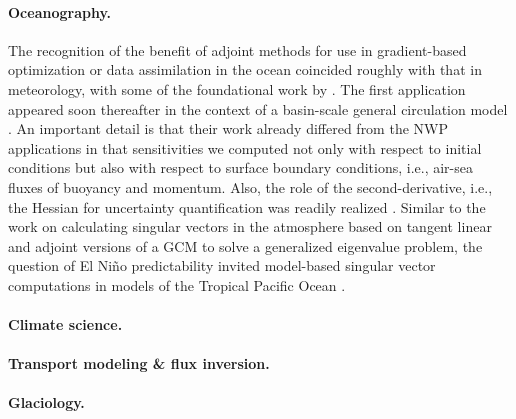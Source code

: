 \paragraph{Oceanography.}
The recognition of the benefit of adjoint methods for use in gradient-based optimization or data assimilation in the ocean coincided roughly with that in meteorology, with some of the foundational work by \cite{Thacker:1988kp,Thacker:1988ed}. 
The first application appeared soon thereafter in the context of a basin-scale general circulation model \cite{Tziperman.1989,Tziperman:1992hg,Tziperman:1992jw}. 
An important detail is that their work already differed from the NWP applications in that sensitivities we computed not only with respect to initial conditions but also with respect to surface boundary conditions, i.e., air-sea fluxes of buoyancy and momentum.
Also, the role of the second-derivative, i.e., the Hessian for uncertainty quantification was readily realized \cite{Thacker:1989jf}.
Similar to the work on calculating singular vectors in the atmosphere based on tangent linear and adjoint versions of a GCM to solve a generalized eigenvalue problem, the question of El Niño predictability invited model-based singular vector computations in models of the Tropical Pacific Ocean \cite{Moore:1997ci,Moore:1997fp}.


\paragraph{Climate science.}

\paragraph{Transport modeling \& flux inversion.}

\paragraph{Glaciology.}


